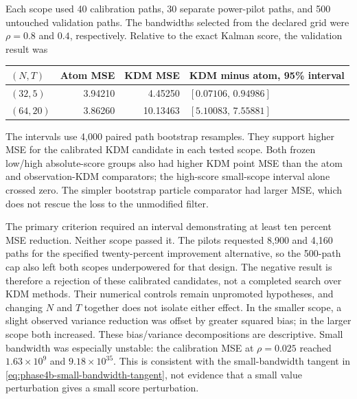 \documentclass[11pt]{article}
\begin{document}
Each scope used 40 calibration paths, 30 separate power-pilot paths, and 500
untouched validation paths.  The bandwidths selected from the declared grid
were $\rho=0.8$ and $0.4$, respectively.  Relative to the exact Kalman score,
the validation result was
\begin{center}
\begin{tabular}{lrrl}
\toprule
$(N,T)$ & Atom MSE & KDM MSE & KDM minus atom, 95\% interval\\
\midrule
$(32,5)$ & 3.94210 & 4.45250 & $[0.07106,\,0.94986]$\\
$(64,20)$ & 3.86260 & 10.13463 & $[5.10083,\,7.55881]$\\
\bottomrule
\end{tabular}
\end{center}
The intervals use 4,000 paired path bootstrap resamples.  They support higher
MSE for the calibrated KDM candidate in each tested scope.  Both frozen
low/high absolute-score groups also had higher KDM point MSE than the atom
and observation-KDM comparators; the high-score small-scope interval alone
crossed zero.  The simpler bootstrap particle comparator had larger MSE,
which does not rescue the loss to the unmodified filter.

The primary criterion required an interval demonstrating at least ten percent
MSE reduction.  Neither scope passed it.  The pilots requested 8,900 and
4,160 paths for the specified twenty-percent improvement alternative, so the
500-path cap also left both scopes underpowered for that design.  The
negative result is therefore a rejection of these calibrated candidates,
not a completed search over KDM methods.  Their numerical controls remain
unpromoted hypotheses, and changing $N$ and $T$ together does not isolate
either effect.  In the smaller scope, a slight observed variance reduction
was offset by greater squared bias; in the larger scope both increased.
These bias/variance decompositions are descriptive.  Small bandwidth was
especially unstable: the calibration MSE at $\rho=0.025$ reached
$1.63\times10^9$ and $9.18\times10^{35}$.  This is consistent with the
small-bandwidth tangent in \eqref{eq:phase4b-small-bandwidth-tangent}, not
evidence that a small value perturbation gives a small score perturbation.
\end{document}
